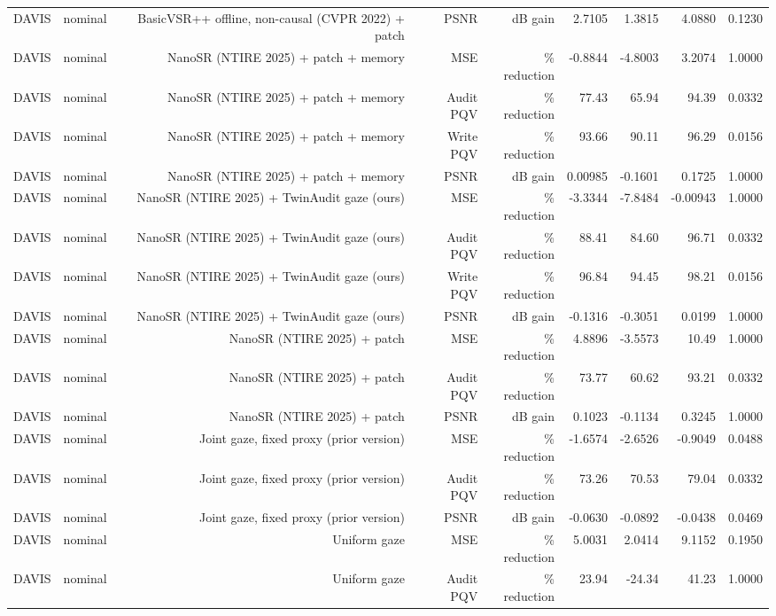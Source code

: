 \begin{table}[t]
\begin{tabular}{llrrrrrrr}
DAVIS & nominal & BasicVSR++ offline, non-causal (CVPR 2022) + patch & PSNR & dB gain & 2.7105 & 1.3815 & 4.0880 & 0.1230 \\
DAVIS & nominal & NanoSR (NTIRE 2025) + patch + memory & MSE & \% reduction & -0.8844 & -4.8003 & 3.2074 & 1.0000 \\
DAVIS & nominal & NanoSR (NTIRE 2025) + patch + memory & Audit PQV & \% reduction & 77.43 & 65.94 & 94.39 & 0.0332 \\
DAVIS & nominal & NanoSR (NTIRE 2025) + patch + memory & Write PQV & \% reduction & 93.66 & 90.11 & 96.29 & 0.0156 \\
DAVIS & nominal & NanoSR (NTIRE 2025) + patch + memory & PSNR & dB gain & 0.00985 & -0.1601 & 0.1725 & 1.0000 \\
DAVIS & nominal & NanoSR (NTIRE 2025) + TwinAudit gaze (ours) & MSE & \% reduction & -3.3344 & -7.8484 & -0.00943 & 1.0000 \\
DAVIS & nominal & NanoSR (NTIRE 2025) + TwinAudit gaze (ours) & Audit PQV & \% reduction & 88.41 & 84.60 & 96.71 & 0.0332 \\
DAVIS & nominal & NanoSR (NTIRE 2025) + TwinAudit gaze (ours) & Write PQV & \% reduction & 96.84 & 94.45 & 98.21 & 0.0156 \\
DAVIS & nominal & NanoSR (NTIRE 2025) + TwinAudit gaze (ours) & PSNR & dB gain & -0.1316 & -0.3051 & 0.0199 & 1.0000 \\
DAVIS & nominal & NanoSR (NTIRE 2025) + patch & MSE & \% reduction & 4.8896 & -3.5573 & 10.49 & 1.0000 \\
DAVIS & nominal & NanoSR (NTIRE 2025) + patch & Audit PQV & \% reduction & 73.77 & 60.62 & 93.21 & 0.0332 \\
DAVIS & nominal & NanoSR (NTIRE 2025) + patch & PSNR & dB gain & 0.1023 & -0.1134 & 0.3245 & 1.0000 \\
DAVIS & nominal & Joint gaze, fixed proxy (prior version) & MSE & \% reduction & -1.6574 & -2.6526 & -0.9049 & 0.0488 \\
DAVIS & nominal & Joint gaze, fixed proxy (prior version) & Audit PQV & \% reduction & 73.26 & 70.53 & 79.04 & 0.0332 \\
DAVIS & nominal & Joint gaze, fixed proxy (prior version) & PSNR & dB gain & -0.0630 & -0.0892 & -0.0438 & 0.0469 \\
DAVIS & nominal & Uniform gaze & MSE & \% reduction & 5.0031 & 2.0414 & 9.1152 & 0.1950 \\
DAVIS & nominal & Uniform gaze & Audit PQV & \% reduction & 23.94 & -24.34 & 41.23 & 1.0000 \\

\end{tabular}
\end{table}
